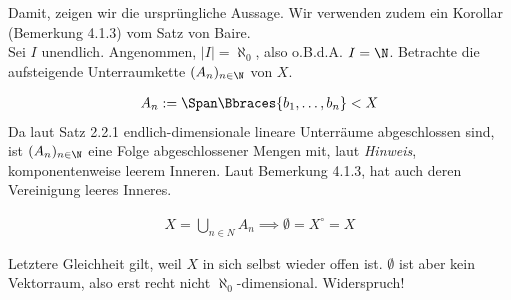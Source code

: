 \begin{solution}
Damit, zeigen wir die ursprüngliche Aussage.
Wir verwenden zudem ein Korollar (Bemerkung 4.1.3) vom Satz von Baire. \\

Sei $I$ unendlich.
Angenommen, $|I| = \aleph_0$, also o.B.d.A. $I = \N$.
Betrachte die aufsteigende Unterraumkette $(A_n)_{n \in \N}$ von $X$.

\begin{align*}
  A_n := \Span \Bbraces{b_1, \ldots, b_n} < X
\end{align*}
Da laut Satz 2.2.1 endlich-dimensionale lineare Unterräume abgeschlossen sind, ist
$(A_n)_{n \in \N}$ eine Folge abgeschlossener Mengen mit, laut \textit{Hinweis}, komponentenweise leerem Inneren.
Laut Bemerkung 4.1.3, hat auch deren Vereinigung leeres Inneres.

\begin{align*}
  X = \bigcup_{n \in N} A_n
  \implies
  \emptyset = X^\circ = X
\end{align*}

Letztere Gleichheit gilt, weil $X$ in sich selbst wieder offen ist.
$\emptyset$ ist aber kein Vektorraum, also erst recht nicht $\aleph_0$-dimensional.
Widerspruch!

\end{solution}
